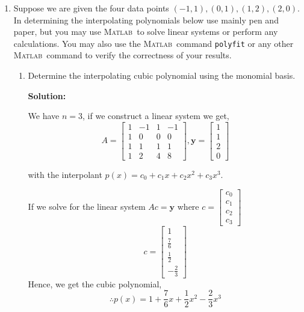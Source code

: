 \documentclass[11pt]{article}
\newcommand{\matlab}{\textsc{Matlab\ }}
\newenvironment{solution}
  {\par\noindent\textbf{Solution:}\par}
  {\par}
\begin{document}
\begin{enumerate}
\item Suppose we are given the four data points $(-1,1), (0,1), (1,2), (2,0)$.
In determining the interpolating polynomials below use mainly pen and paper, but you may use \matlab to solve linear systems or perform any calculations. You may also use the \matlab  command {\tt polyfit} or any other \matlab command to verify the correctness of your results.
\begin{enumerate}
\item Determine the interpolating cubic polynomial using the monomial basis. 
  \begin{solution}
  We have $n=3$, if we construct a linear system we get,
  $$A = \begin{bmatrix}
    1 & -1 & 1 & -1 \\ 
    1 & 0 & 0 & 0 \\ 
    1 & 1 & 1 & 1 \\ 
    1 & 2 & 4 & 8

  \end{bmatrix}, \textbf{y} = 
  \begin{bmatrix}
    1 \\ 1 \\ 2 \\ 0
  \end{bmatrix}$$
  \end{solution}
  with the interpolant $p(x) = c_0+ c_1 x + c_2 x^2 + c_3 x^3$. 

  If we solve for the linear system $Ac =\textbf{y}$ where $c = \begin{bmatrix} c_0 \\ c_1 \\ c_2 \\ c_3 \end{bmatrix}$
  $$c = \begin{bmatrix} 1 \\[3pt]  \frac{7}{6} \\[3pt]  \frac{1}{2}\\[3pt] -\frac{2}{3} \end{bmatrix}$$
  Hence, we get the cubic polynomial,
  $$\therefore p(x) =  1 + \frac{7}{6}x + \frac{1}{2}x^2 - \frac{2}{3}x^3$$



\end{enumerate}
\end{enumerate}
\end{document}

